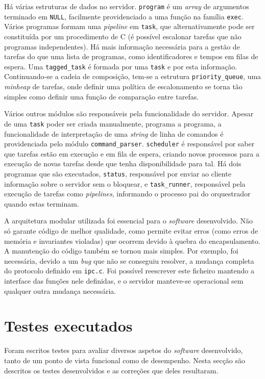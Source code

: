 \documentclass[11pt]{article}
\begin{document}
Há várias estruturas de dados no servidor. \texttt{program} é um \emph{array} de argumentos
terminado em \texttt{NULL}, facilmente providenciado a uma função na família \texttt{exec}. Vários
programas formam uma \emph{pipeline} em \texttt{task}, que alternativamente pode ser constituída por
um procedimento de C (é possível escalonar tarefas que não programas independentes). Há mais
informação necessária para a gestão de tarefas do que uma lista de programas, como identificadores e
tempos em filas de espera. Uma \texttt{tagged\_task} é formada por uma \texttt{task} e por esta
informação. Continuando-se a cadeia de composição, tem-se a estrutura \texttt{priority\_queue}, uma
\emph{minheap} de tarefas, onde definir uma política de escalonamento se torna tão simples como
definir uma função de comparação entre tarefas.

Vários outros módulos são responsáveis pela funcionalidade do servidor. Apesar de uma \texttt{task}
poder ser criada manualmente, programa a programa, a funcionalidade de interpretação de uma
\emph{string} de linha de comandos é providenciada pelo módulo \texttt{command\_parser}.
\texttt{scheduler} é responsável por saber que tarefas estão em execução e em fila de espera,
criando novos processos para a execução de novas tarefas desde que tenha disponibilidade para tal.
Há dois programas que são executados, \texttt{status}, responsável por enviar ao cliente informação
sobre o servidor sem o bloquear, e \texttt{task\_runner}, responsável pela execução de tarefas
como \emph{pipelines}, informando o processo pai do orquestrador quando estas terminam.

A arquitetura modular utilizada foi essencial para o \emph{software} desenvolvido. Não só garante
código de melhor qualidade, como permite evitar erros (como erros de memória e invariantes violadas)
que ocorrem devido à quebra do encapsulamento. A manutenção do código também se tornou mais simples.
Por exemplo, foi necessária, devido a um \emph{bug} que não se conseguiu resolver, a mudança
completa do protocolo definido em \texttt{ipc.c}. Foi possível reescrever este ficheiro mantendo a
interface das funções nele definidas, e o servidor manteve-se operacional sem qualquer outra mudança
necessária.

\section{Testes executados}

Foram escritos testes para avaliar diversos aspetos do \emph{software} desenvolvido, tanto de um
ponto de vista funcional como de desempenho. Nesta secção são descritos os testes desenvolvidos e
as correções que deles resultaram.
\end{document}
